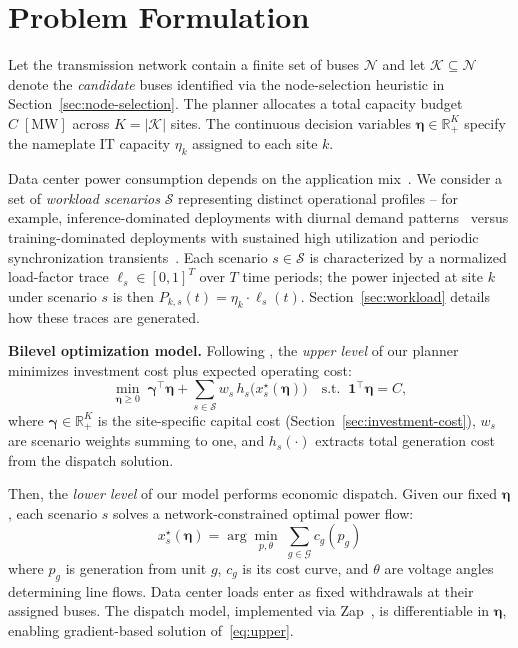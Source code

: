 \section{Problem Formulation}
\label{sec:problem}

Let the transmission network contain a finite set of buses
$\mathcal{N}$ and let $\mathcal{K}\subseteq\mathcal{N}$ denote the
\emph{candidate} buses identified via the node-selection heuristic
in Section~\ref{sec:node-selection}. The planner allocates a
total capacity budget $C\;[\mathrm{MW}]$ across $K=|\mathcal{K}|$ sites.
The continuous decision variables $\boldsymbol{\eta}\in\mathbb{R}_{+}^{K}$
specify the nameplate IT capacity $\eta_k$ assigned to each site $k$.

Data center power consumption depends on the application mix~\cite{patel2024llms}.
We consider a set of \emph{workload scenarios} $\mathcal{S}$
representing distinct operational profiles -- for example,
inference-dominated deployments with diurnal demand patterns~\cite{dynamollm}
versus training-dominated deployments with sustained high
utilization and periodic synchronization transients~\cite{stabilization}.
Each scenario $s \in \mathcal{S}$ is characterized by a
normalized load-factor trace $\boldsymbol{\ell}_s \in [0,1]^T$
over $T$ time periods; the power injected at site $k$
under scenario $s$ is then
$P_{k,s}(t) = \eta_k \cdot \ell_s(t)$.
Section~\ref{sec:workload} details how these traces are generated.

\noindent\textbf{Bilevel optimization model.} Following \citet{degleris2024gradient}, the \textit{upper level} of our planner minimizes
investment cost plus expected operating cost:
\begin{equation}
\label{eq:upper}
\min_{\boldsymbol{\eta}\ge 0}\;
  \boldsymbol{\gamma}^{\!\top}\boldsymbol{\eta}
  + \sum_{s\in\mathcal{S}} w_s\, h_s\bigl(x_s^\star(\boldsymbol{\eta})\bigr)
\quad\text{s.t.}\;\;
  \mathbf{1}^{\!\top}\boldsymbol{\eta}=C,
\end{equation}
where $\boldsymbol{\gamma}\in\mathbb{R}_{+}^{K}$ is the site-specific
capital cost (Section~\ref{sec:investment-cost}), $w_s$ are
scenario weights summing to one, and $h_s(\cdot)$ extracts
total generation cost from the dispatch solution.

Then, the \textit{lower level} of our model performs economic dispatch.
Given our fixed $\boldsymbol{\eta}$, each scenario $s$ solves a
network-constrained optimal power flow:
\begin{equation}
\label{eq:lower}
x_s^\star(\boldsymbol{\eta})
= \arg\min_{p,\theta}\;
  \sum_{g \in \mathcal{G}} c_g(p_g)
\end{equation}
where $p_g$ is generation from unit $g$, $c_g$ is its cost curve,
and $\theta$ are voltage angles determining line flows.
Data center loads enter as fixed withdrawals at their assigned buses.
The dispatch model, implemented via Zap~\citep{degleris2024gpu},
is differentiable in $\boldsymbol{\eta}$, enabling gradient-based
solution of~\eqref{eq:upper}.